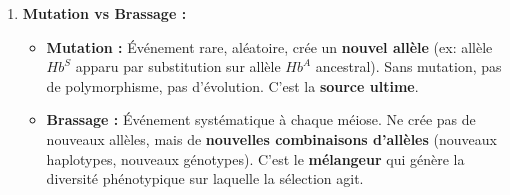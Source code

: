 \documentclass[11pt]{article}
\begin{document}
\begin{exoresolu}
\begin{enumerate}
        \item \textbf{Mutation vs Brassage :}
              \begin{itemize}
                  \item \textbf{Mutation :} Événement rare, aléatoire, crée un \textbf{nouvel allèle} (ex: allèle $Hb^S$ apparu par substitution sur allèle $Hb^A$ ancestral). Sans mutation, pas de polymorphisme, pas d'évolution. C'est la \textbf{source ultime}.
                  \item \textbf{Brassage :} Événement systématique à chaque méiose. Ne crée pas de nouveaux allèles, mais de \textbf{nouvelles combinaisons d'allèles} (nouveaux haplotypes, nouveaux génotypes). C'est le \textbf{mélangeur} qui génère la diversité phénotypique sur laquelle la sélection agit.
              \end{itemize}
    \end{enumerate}
\end{exoresolu}
\end{document}
